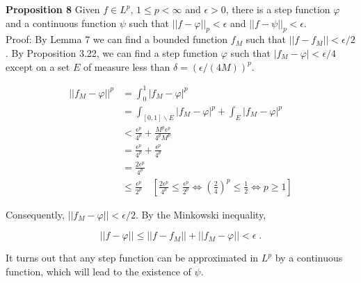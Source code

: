 \documentclass[a4paper]{article}
\begin{document}
{\bf Proposition 8} Given $f \in L^p$, $1\leq p < \infty$ and $\epsilon > 0$, there is a step function $\varphi$ and a continuous function $\psi$ such that $||f - \varphi||_p < \epsilon$ and $||f - \psi ||_p < \epsilon$. \\

Proof: By Lemma 7 we can find a bounded function $f_M$ such that $||f - f_M || < \epsilon /2$. By Proposition 3.22, we can find a step function $\varphi$ such that $|f_M - \varphi| < \epsilon / 4$ except on a set $E$ of measure less than $\delta = \left(\epsilon / (4M) \right)^p$. 

\begin{align*}
||f_M - \varphi||^p &= \int_0^1 |f_M - \varphi|^p \\
&= \int_{[0,1] \backslash E} |f_M - \varphi|^p + \int_E |f_M - \varphi|^p \\
& < \frac{\epsilon^p}{4^p} + \frac{M^p\epsilon^p}{4^pM^p} \\
&= \frac{\epsilon^p}{4^p} + \frac{\epsilon^p}{4^p} \\
&= \frac{2\epsilon^p}{4^p} \\
& \leq \frac{\epsilon^p}{2^p} \quad \left[\frac{2\epsilon^p}{4^p} \leq \frac{\epsilon^p}{2^p} \iff \left(\frac{2}{4}\right)^p \leq \frac{1}{2} \iff p \geq 1 \right]
\end{align*}

Consequently, $||f_M - \varphi || < \epsilon /2$. By the Minkowski inequality,

$$||f - \varphi|| \leq ||f - f_M || + ||f_M - \varphi|| < \epsilon \;.$$

It turns out that any step function can be approximated in $L^p$ by a continuous function, which will lead to the existence of $\psi$. 
\end{document}

